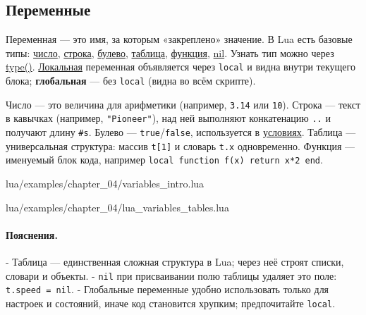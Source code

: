 \subsection{Переменные}
Переменная — это имя, за которым «закреплено» значение. В Lua есть базовые типы: \hyperlink{term:number}{число}, \hyperlink{term:string}{строка}, \hyperlink{term:boolean}{булево}, \hyperlink{term:table}{таблица}, \hyperlink{term:function}{функция}, \hyperlink{term:nil}{nil}. Узнать тип можно через \hyperlink{term:type}{type()}. \hyperlink{term:scope}{Локальная} переменная объявляется через \verb|local| и видна внутри текущего блока; \textbf{глобальная} — без \verb|local| (видна во всём скрипте).

Число — это величина для арифметики (например, \verb|3.14| или \verb|10|). Строка — текст в кавычках (например, \verb|"Pioneer"|), над ней выполняют конкатенацию \verb|..| и получают длину \verb|#s|. Булево — \verb|true|/\verb|false|, используется в \hyperlink{term:condition}{условиях}. Таблица — универсальная структура: массив \verb|t[1]| и словарь \verb|t.x| одновременно. Функция — именуемый блок кода, например \verb|local function f(x) return x*2 end|.

\begin{codefile}{lua/examples/chapter_04/variables_intro.lua}
\end{codefile}
\begin{codefile}{lua/examples/chapter_04/lua_variables_tables.lua}
\end{codefile}
\paragraph{Пояснения.}
- Таблица — единственная сложная структура в Lua; через неё строят списки, словари и объекты.
- \verb|nil| при присваивании полю таблицы удаляет это поле: \verb|t.speed = nil|.
- Глобальные переменные удобно использовать только для настроек и состояний, иначе код становится хрупким; предпочитайте \verb|local|.

